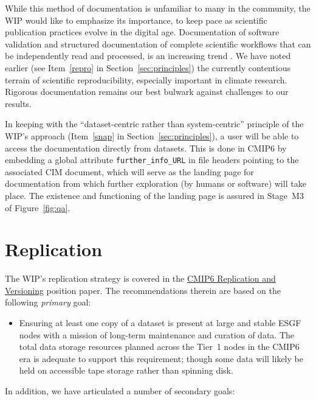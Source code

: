\documentclass[gmd,manuscript]{copernicus}
\newcommand{\figref}[1] {\mbox{Figure   \ref{fig:#1}}}
\newcommand{\secref}[1] {\mbox{Section  \ref{sec:#1}}}
\begin{document}
While this method of documentation is unfamiliar to many in the
community, the WIP would like to emphasize its importance, to keep
pace as scientific publication practices evolve in the digital age.
Documentation of software validation \citep[see e.g][]{ref:peng2011}
and structured documentation of complete scientific workflows that can
be independently read and processed, is an increasing trend \citep[see
the special issue on the ``Geoscience Paper of the Future'',
][]{ref:davidetal2016}. We have noted earlier (see Item~\ref{repro} in
\secref{principles}) the currently contentious terrain of scientific
reproducibility, especially important in climate research. Rigorous
documentation remains our best bulwark against challenges to our results.

In keeping with the ``dataset-centric rather than system-centric''
principle of the WIP's approach (Item~\ref{snap} in
\secref{principles}), a user will be able to access the documentation
directly from datasets. This is done in CMIP6 by embedding a global
attribute \texttt{further\_info\_URL} in file headers pointing to the
associated CIM 
document, which will serve as the landing page for
documentation from which further exploration (by humans or software)
will take place. The existence and functioning of the landing page is
assured in Stage~M3 of \figref{qa}.

\section{Replication}
\label{sec:replica}

The WIP's replication strategy is covered in the
\href{https://goo.gl/jqWjQ5}{CMIP6 Replication and Versioning}
position paper. The recommendations therein are based on the following
\emph{primary} goal:

\begin{itemize}
\item Ensuring at least one copy of a dataset is present at large and
  stable ESGF nodes with a mission of long-term maintenance and
  curation of data. The total data storage resources planned across
  the Tier~1 nodes in the CMIP6 era is adequate to support this
  requirement; though some data will likely be held on accessible tape
  storage rather than spinning disk.
\end{itemize}

In addition, we have articulated a number of secondary goals:
\end{document}
